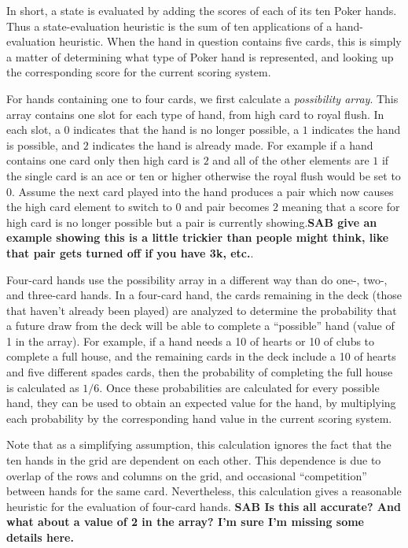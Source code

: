 \documentclass[letterpaper]{article}
\begin{document}
In short, a state is evaluated by adding the scores of each of its ten Poker hands. Thus a state-evaluation heuristic is the sum of ten applications of a hand-evaluation heuristic. When the hand in question contains five cards, this is simply a matter of determining what type of Poker hand is represented, and looking up the corresponding score for the current scoring system.

For hands containing one to four cards, we first calculate a {\it possibility array}. This array contains one slot for each type of hand, from high card to royal flush. In each slot, a $0$ indicates that the hand is no longer possible, a $1$ indicates the hand is possible, and $2$ indicates the hand is already made. For example if a hand contains one card only then high card is $2$ and all of the other elements are $1$ if the single card is an ace or ten or higher otherwise the royal flush would be set to $0$. Assume the next card played into the hand produces a pair which now causes the high card element to switch to $0$ and pair becomes $2$ meaning that a score for high card is no longer possible but a pair is currently showing.{\bf SAB give an example showing this is a little trickier than people might think, like that pair gets turned off if you have 3k, etc.}.

Four-card hands use the possibility array in a different way than do one-, two-, and three-card hands. In a four-card hand, the cards remaining in the deck (those that haven't already been played) are analyzed to determine the probability that a future draw from the deck will be able to complete a ``possible'' hand (value of 1 in the array). For example, if a hand needs a 10 of hearts or 10 of clubs to complete a full house, and the remaining cards in the deck include a 10 of hearts and five different spades cards, then the probability of completing the full house is calculated as $1 / 6$. Once these probabilities are calculated for every possible hand, they can be used to obtain an expected value for the hand, by multiplying each probability by the corresponding hand value in the current scoring system.

Note that as a simplifying assumption, this calculation ignores the fact that the ten hands in the grid are dependent on each other. This dependence is due to overlap of the rows and columns on the grid, and occasional ``competition'' between hands for the same card. Nevertheless, this calculation gives a reasonable heuristic for the evaluation of four-card hands. {\bf SAB Is this all accurate? And what about a value of 2 in the array? I'm sure I'm missing some details here.}
\end{document}
